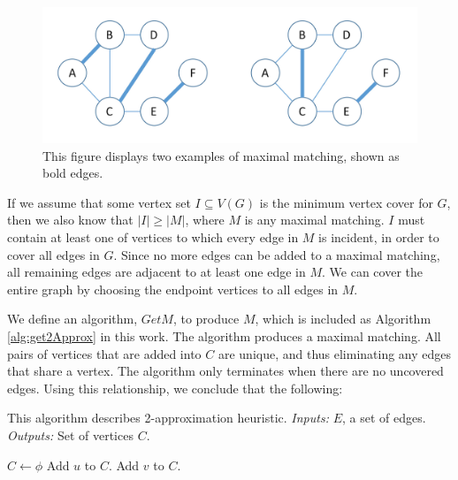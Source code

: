 \documentclass[12pt]{article}
\begin{document}
\begin{figure} \label{fig:maximalmatchings}
	
	
		
		\centering
		\centerline{\includegraphics[width = 5in]{FigureA.jpg}}
	\hfill
	
	\caption{This figure displays two examples of maximal matching, shown as bold edges.}
	
	
\end{figure}

If we assume that some vertex set $I \subseteq V(G)$ is the minimum vertex cover for $G$, then we also know that $|I| \geq |M|$, where $M$ is any maximal matching. $I$ must contain at least one of vertices to which every edge in $M$ is incident, in order to cover all edges in $G$. Since no more edges can be added to a maximal matching, all remaining edges are adjacent to at least one edge in $M$. We can cover the entire graph by choosing the endpoint vertices to all edges in $M$.

We define an algorithm, $GetM$, to produce $M$, which is included as Algorithm \ref{alg:get2Approx} in this work. The algorithm produces a maximal matching. All pairs of vertices that are added into $C$ are unique, and thus eliminating any edges that share a vertex. The algorithm only terminates when there are no uncovered edges. Using this relationship, we conclude that the following:


\begin{algorithm}[ht!]
	\caption{This algorithm describes 2-approximation heuristic. \textit{Inputs:} $E$, a set of edges.
		\textit{Outputs:} Set of vertices $C$.} 
	\begin{algorithmic}[1]
		
		
		\State $C \gets \phi$ 
		 
		\State Add $u$ to $C$.
		\State Add $v$ to $C$.
		\EndWhile
		\EndProcedure
		
	\end{algorithmic}	
	\label{alg:get2Approx}
\end{algorithm}
\end{document}
